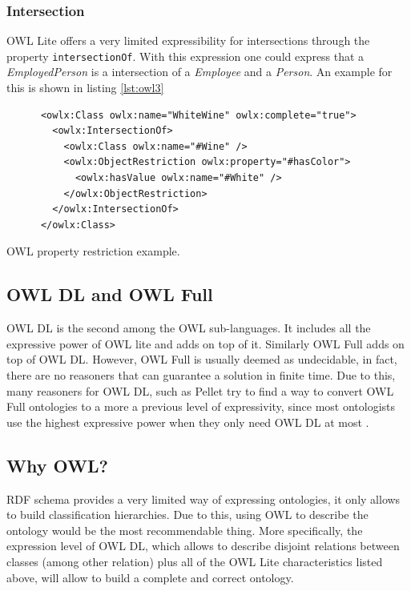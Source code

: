 \subsubsection*{Intersection}

OWL Lite offers a very limited expressibility for intersections through the property \texttt{intersectionOf}. With this expression one could express that a \textit{EmployedPerson} is a intersection of a \textit{Employee} and a \textit{Person}. An example for this is shown in listing \ref{lst:owl3}

\begin{listing}\centering
  \begin{minipage}{.8\textwidth}
    \begin{verbatim}
      <owlx:Class owlx:name="WhiteWine" owlx:complete="true">
        <owlx:IntersectionOf>
          <owlx:Class owlx:name="#Wine" />
          <owlx:ObjectRestriction owlx:property="#hasColor">
            <owlx:hasValue owlx:name="#White" /> 
          </owlx:ObjectRestriction>
        </owlx:IntersectionOf>
      </owlx:Class>
    \end{verbatim}
  \end{minipage}
  \caption{OWL property restriction example.}\label{lst:owl3}
\end{listing}

\subsection*{OWL DL and OWL Full}

OWL DL is the second among the OWL sub-languages. It includes all the expressive power of OWL lite and adds on top of it. Similarly OWL Full adds on top of OWL DL. However, OWL Full is usually deemed as undecidable, in fact, there are no reasoners that can guarantee a solution in finite time. Due to this, many reasoners for OWL DL, such as Pellet try to find a way to convert OWL Full ontologies to a more a previous level of expressivity, since most ontologists use the highest expressive power when they only need OWL DL at most \cite{pellet}.

\subsection*{Why OWL?}

RDF schema provides a very limited way of expressing ontologies, it only allows to build classification hierarchies. Due to this, using OWL to describe the ontology would be the most recommendable thing. More specifically, the expression level of OWL DL, which allows to describe disjoint relations between classes (among other relation) plus all of the OWL Lite characteristics listed above, will allow to build a complete and correct ontology.
